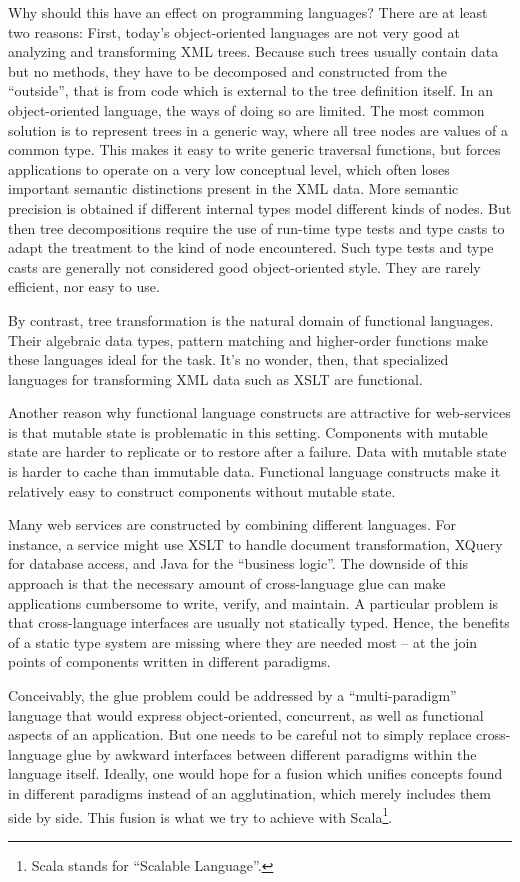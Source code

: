 Why should this have an effect on programming languages? There are at
least two reasons: First, today's object-oriented languages are not
very good at analyzing and transforming XML trees. Because such trees
usually contain data but no methods, they have to be decomposed and
constructed from the ``outside'', that is from code which is external
to the tree definition itself. In an object-oriented language, the
ways of doing so are limited. The most common solution \cite{w3c:dom} is
to represent trees in a generic way, where all tree nodes are values
of a common type.  This makes it easy to write generic traversal
functions, but forces applications to operate on a very low conceptual
level, which often loses important semantic distinctions present in
the XML data.  More semantic precision is obtained if different
internal types model different kinds of nodes.  But then tree
decompositions require the use of run-time type tests and type casts
to adapt the treatment to the kind of node encountered. Such type
tests and type casts are generally not considered good object-oriented
style. They are rarely efficient, nor easy to use.

By contrast, tree transformation is the natural domain of functional
languages. Their algebraic data types, pattern matching and
higher-order functions make these languages ideal for the task. It's
no wonder, then, that specialized languages for transforming XML data
such as XSLT are functional.

Another reason why functional language constructs are attractive for
web-services is that mutable state is problematic in this setting.
Components with mutable state are harder to replicate or to restore
after a failure. Data with mutable state is harder to cache than
immutable data. Functional language constructs make it relatively easy
to construct components without mutable state.

Many web services are constructed by combining different languages.
For instance, a service might use XSLT to handle document
transformation, XQuery for database access, and Java for the
``business logic''.  The downside of this approach is that the
necessary amount of cross-language glue can make applications
cumbersome to write, verify, and maintain. A particular problem is
that cross-language interfaces are usually not statically typed.
Hence, the benefits of a static type system are missing where they are
needed most -- at the join points of components written in different
paradigms.  

Conceivably, the glue problem could be addressed by a ``multi-paradigm''
language that would express object-oriented, concurrent, as well
as functional aspects of an application.  But one needs to be careful
not to simply replace cross-language glue by awkward interfaces
between different paradigms within the language itself.  Ideally, one
would hope for a fusion which unifies concepts found in different
paradigms instead of an agglutination, which merely includes them side
by side.  This fusion is what we try to achieve with Scala\footnote{Scala
stands for ``Scalable Language''.}.

